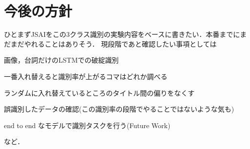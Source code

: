 \documentclass[onecolumn]{ujarticle}   %
\begin{document}
	\section{今後の方針}\noindent
	ひとまずJSAIをこの3クラス識別の実験内容をベースに書きたい．本番までにまだまだやれることはありそう．
	現段階であと確認したい事項としては
	\begin{itemize}{
			\item{画像，台詞だけのLSTMでの破綻識別}
			\item{一番入れ替えると識別率が上がるコマはどれか調べる}
			\item{ランダムに入れ替えているところのタイトル間の偏りをなくす}
			\item{誤識別したデータの確認(この識別率の段階でやることではないような気も)}
			\item{end to end なモデルで識別タスクを行う(Future Work)}
	}\end{itemize}
	など．
\end{document}

